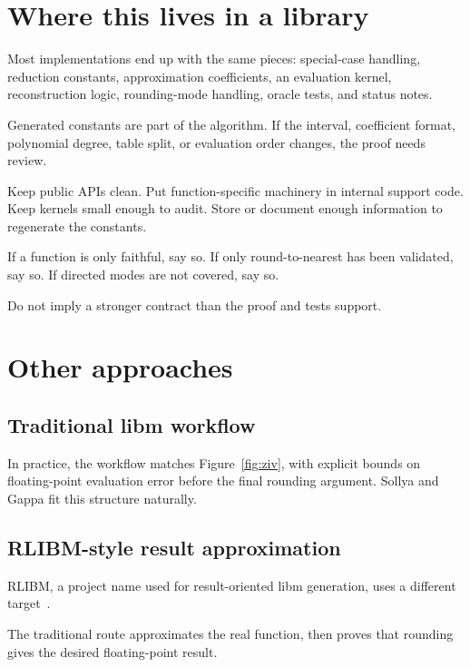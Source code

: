 \documentclass[manuscript, nonacm]{acmart}
\begin{document}
    \section{Where this lives in a library}

    Most implementations end up with the same pieces: special-case handling,
    reduction constants, approximation coefficients, an evaluation kernel,
    reconstruction logic, rounding-mode handling, oracle tests, and status notes.

    Generated constants are part of the algorithm. If the interval, coefficient
    format, polynomial degree, table split, or evaluation order changes, the
    proof needs review.

    Keep public APIs clean. Put function-specific machinery in internal support
    code. Keep kernels small enough to audit. Store or document enough
    information to regenerate the constants.

    If a function is only faithful, say so. If only round-to-nearest has been
    validated, say so. If directed modes are not covered, say so.

    Do not imply a stronger contract than the proof and tests support.



    \section{Other approaches}

    \subsection{Traditional libm workflow}

    In practice, the workflow matches Figure~\ref{fig:ziv}, with explicit bounds
    on floating-point evaluation error before the final rounding argument. Sollya
    and Gappa fit this structure naturally.

    \subsection{RLIBM-style result approximation}

    RLIBM, a project name used for result-oriented libm generation, uses a different target~\cite{rlibm}.

    The traditional route approximates the real function, then proves that
    rounding gives the desired floating-point result.
\end{document}
